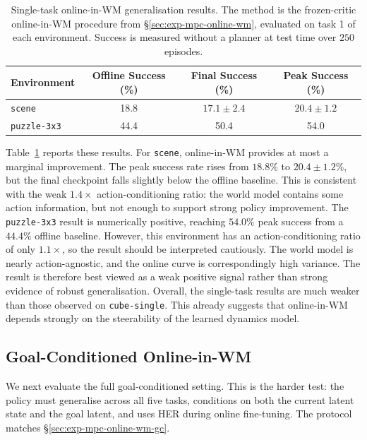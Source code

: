 \begin{table}[h]
\centering
\caption{Single-task online-in-WM generalisation results. The method is
the frozen-critic online-in-WM procedure from
\S\ref{sec:exp-mpc-online-wm}, evaluated on task 1 of each environment.
Success is measured without a planner at test time over $250$
episodes.}
\label{tab:gen-single-task}
\begin{tabular}{lccc}
\toprule
Environment & Offline Success (\%) & Final Success (\%) & Peak Success (\%) \\
\midrule
\texttt{scene} & 18.8 & $17.1 \pm 2.4$ & $20.4 \pm 1.2$ \\
\texttt{puzzle-3x3} & 44.4 & 50.4 & 54.0 \\
\bottomrule
\end{tabular}
\end{table}

Table~\ref{tab:gen-single-task} reports these results. For \texttt{scene},
online-in-WM provides at most a marginal improvement. The peak success rate rises from $18.8\%$ to
$20.4 \pm 1.2\%$, but the final checkpoint falls slightly below the
offline baseline. This is consistent with the weak
$1.4\times$ action-conditioning ratio: the world model contains some
action information, but not enough to support strong policy
improvement.
The \texttt{puzzle-3x3} result is numerically positive, reaching
$54.0\%$ peak success from a $44.4\%$ offline baseline. However, this
environment has an action-conditioning ratio of only $1.1\times$, so
the result should be interpreted cautiously. The world model is nearly
action-agnostic, and the online curve is correspondingly high variance.
The result is therefore best viewed as a weak positive signal rather
than strong evidence of robust generalisation.
Overall, the single-task results are much weaker than those observed on
\texttt{cube-single}. This already suggests that online-in-WM depends
strongly on the steerability of the learned dynamics model.

\subsection{Goal-Conditioned Online-in-WM}
\label{sec:exp-gen-goal-conditioned}

We next evaluate the full goal-conditioned setting. This is the harder
test: the policy must generalise across all five tasks, conditions on
both the current latent state and the goal latent, and uses HER during
online fine-tuning. The protocol matches
\S\ref{sec:exp-mpc-online-wm-gc}.

